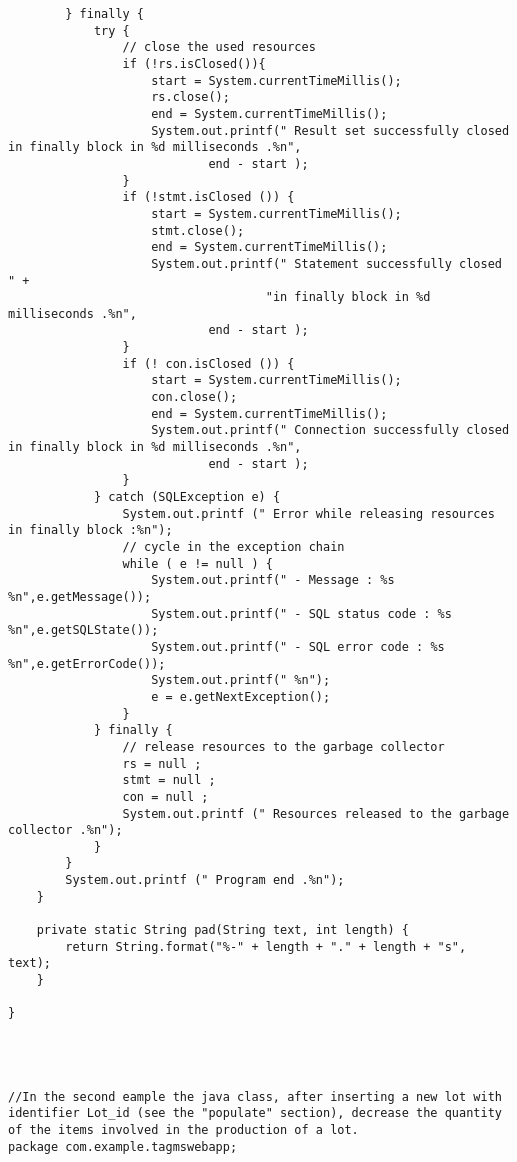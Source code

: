 \begin{lstlisting}
        } finally {
            try {
                // close the used resources
                if (!rs.isClosed()){
                    start = System.currentTimeMillis();
                    rs.close();
                    end = System.currentTimeMillis();
                    System.out.printf(" Result set successfully closed in finally block in %d milliseconds .%n",
                            end - start );
                }
                if (!stmt.isClosed ()) {
                    start = System.currentTimeMillis();
                    stmt.close();
                    end = System.currentTimeMillis();
                    System.out.printf(" Statement successfully closed " +
                                    "in finally block in %d milliseconds .%n",
                            end - start );
                }
                if (! con.isClosed ()) {
                    start = System.currentTimeMillis();
                    con.close();
                    end = System.currentTimeMillis();
                    System.out.printf(" Connection successfully closed in finally block in %d milliseconds .%n",
                            end - start );
                }
            } catch (SQLException e) {
                System.out.printf (" Error while releasing resources in finally block :%n");
                // cycle in the exception chain
                while ( e != null ) {
                    System.out.printf(" - Message : %s %n",e.getMessage());
                    System.out.printf(" - SQL status code : %s %n",e.getSQLState());
                    System.out.printf(" - SQL error code : %s %n",e.getErrorCode());
                    System.out.printf(" %n");
                    e = e.getNextException();
                }
            } finally {
                // release resources to the garbage collector
                rs = null ;
                stmt = null ;
                con = null ;
                System.out.printf (" Resources released to the garbage collector .%n");
            }
        }
        System.out.printf (" Program end .%n");
    }

    private static String pad(String text, int length) {
        return String.format("%-" + length + "." + length + "s", text);
    }

}




//In the second eample the java class, after inserting a new lot with identifier Lot_id (see the "populate" section), decrease the quantity of the items involved in the production of a lot.
package com.example.tagmswebapp;


\end{lstlisting}
